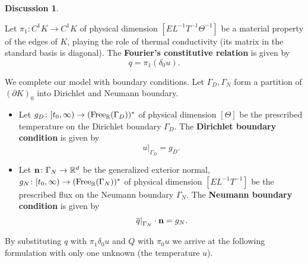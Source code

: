 \documentclass[fleqn]{article}
\theoremstyle{definition}
\newtheorem{discussion}[theorem]{Discussion}
\newcommand{\R}{\mathbb{R}}
\newcommand{\restrict}[2]{\left. #1 \right|_{#2}}
\begin{document}
\begin{discussion}
\begin{itemize}
      Let $\pi_1 \colon C^1 K \to C^1 K$
      of physical dimension $[E L^{-1} T^{-1} \Theta^{-1}]$
      be a material property of the edges of $K$,
      playing the role of thermal conductivity
      (its matrix in the standard basis is diagonal).
      The \textbf{Fourier's constitutive relation} is given by
      \begin{equation}
        q = \pi_1 (\delta_0 u).
      \end{equation}
  \end{itemize}
  We complete our model with boundary conditions.
  Let $\Gamma_D, \Gamma_N$ form a partition of $(\partial K)_0$
  into Dirichlet and Neumann boundary.
  \begin{itemize}
    \item
      Let $g_D \colon [t_0, \infty) \to ({\rm Free}_\R(\Gamma_D))^*$
      of physical dimension $[\Theta]$
      be the prescribed temperature on the Dirichlet boundary $\Gamma_D$.
      The \textbf{Dirichlet boundary condition} is given by
      \begin{equation}
        \restrict{u}{\Gamma_D} = g_D.
      \end{equation}
    \item
      Let
        ${\bf n} \colon \Gamma_N \to \R^d$
          be the generalized exterior normal,
        $g_N \colon [t_0, \infty) \to ({\rm Free}_\R(\Gamma_N))^*$
          of physical dimension $[E L^{-1} T^{-1}]$
          be the prescribed flux on the Neumann boundary $\Gamma_N$.
      The \textbf{Neumann boundary condition} is given by
      \begin{equation}
        \restrict{\overline{q}}{\Gamma_N} \cdot {\bf n} = g_N.
      \end{equation}
  \end{itemize} 
\end{discussion}

By substituting $q$ with $\pi_1 \delta_0 u$ and $Q$ with $\pi_0 u$ we arrive at
the following formulation with only one unknown (the temperature $u$).
\end{document}
